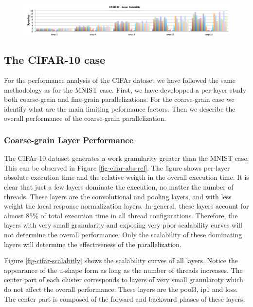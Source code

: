 \begin{figure}[]
\includegraphics[width=\textwidth]{figures/cifar-scalability-layer.pdf}
\caption{}
\end{figure}

\subsection{The CIFAR-10 case}
For the performance analysis of the CIFAr dataset we have followed the 
same methodology as for the MNIST case. First, we have developped a 
per-layer study both coarse-grain and fine-grain parallelizations. 
For the coarse-grain case we identify what are the main limiting 
peformance factors. Then we describe the overall performance of the 
coarse-grain parallelization. 

\subsubsection{Coarse-grain Layer Performance}
The CIFAr-10 dataset generates a work granularity greater than 
the MNIST case. This can be observed in Figure \ref{fig-cifar-abs-rel}. 
The figure shows per-layer absolute execution time and the relative 
weigth in the overall execution time. It is clear that just a few 
layers dominate the execution, no matter the number of threads. 
These layers are the convolutional and pooling layers, and with 
less weight the local response normalization layers. In general, 
these layers account for almost 85\% of total execution time in 
all thread configurations. Therefore, the layers with very small 
granularity and exposing very poor scalability curves will not 
determine the overall performance. Only the scalability of these 
dominating layers will determine the effectiveness of the 
parallelization.

Figure \ref{fig-cifar-scalabitly} shows the scalability curves of all layers. 
Notice the appearance of the u-shape form as long as the number of threads 
increases. The center part of each cluster corresponds to layers of very 
small granularoty which do not affect the overall performance. These layers 
are the pool3, ip1 and loss. The center part is composed of the forward 
and backward phases of these layers.

